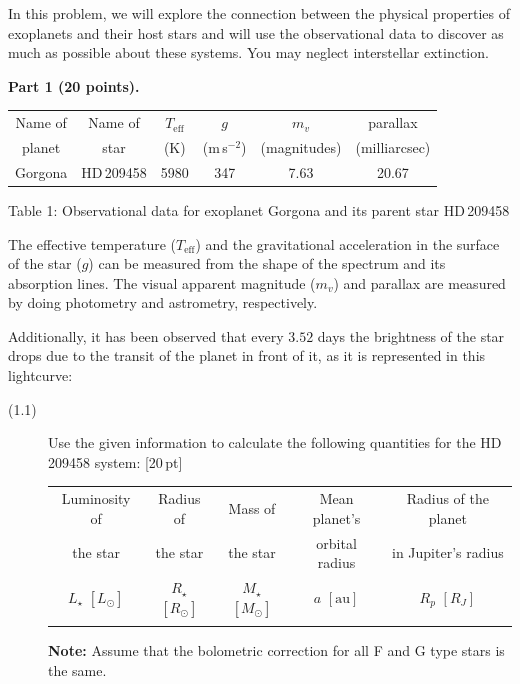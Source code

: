 In this problem, we will explore the connection between the physical properties
of exoplanets and their host stars and will use the observational data to
discover as much as possible about these systems. You may neglect interstellar
extinction.

\medskip
\noindent\textbf{Part 1 (20 points).}

\begin{center}
\begin{tabular}{cccccc}
\toprule
Name of & Name of & $T_{\mathrm{eff}}$ & $g$ & $m_v$ & parallax \\
planet & star & (K) & (m\,s$^{-2}$) & (magnitudes) & (milliarcsec) \\
\midrule
Gorgona & HD\,209458 & 5980 & 347 & 7.63 & 20.67 \\
\bottomrule
\end{tabular}

\smallskip
Table 1: Observational data for exoplanet Gorgona and its parent star HD\,209458
\end{center}

The effective temperature ($T_{\mathrm{eff}}$) and the gravitational
acceleration in the surface of the star ($g$) can be measured from the shape of
the spectrum and its absorption lines.
The visual apparent magnitude ($m_v$) and parallax are measured by doing
photometry and astrometry, respectively.

Additionally, it has been observed that every $3.52$ days the brightness of the
star drops due to the transit of the planet in front of it, as it is
represented in this lightcurve:


\begin{description}
\item[(1.1)] Use the given information to calculate the following quantities
  for the HD\,209458 system: \hfill[20\,pt]

  \begin{center}
  \begin{tabular}{ccccc}
  \toprule
  Luminosity of & Radius of & Mass of & Mean planet's & Radius of the planet\\
  the star & the star & the star & orbital radius & in Jupiter's radius\\
  $L_\star$ $[L_\odot]$ & $R_\star$ $[R_\odot]$ & $M_\star$ $[M_\odot]$
    & $a$ $[\mathrm{au}]$ & $R_p$ $[R_J]$\\
  \midrule
  \phantom{xxxx} & \phantom{xxxx} & \phantom{xxxx} & \phantom{xxxx}
    & \phantom{xxxx}\\
  \bottomrule
  \end{tabular}
  \end{center}

  \textbf{Note:} Assume that the bolometric correction for all F and G type
  stars is the same.
\end{description}

